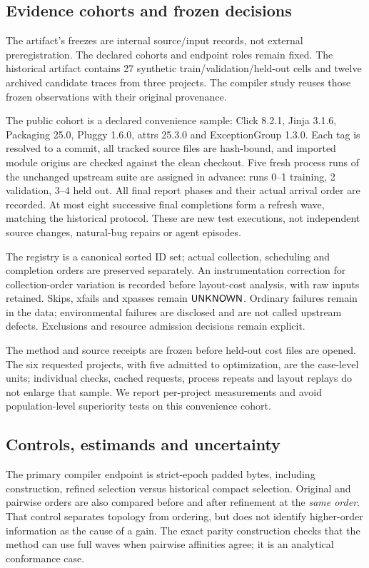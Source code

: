 \documentclass[10pt,journal,compsoc]{IEEEtran}
\theoremstyle{definition}\newtheorem{definition}[theorem]{Definition}
\begin{document}
\subsection{Evidence cohorts and frozen decisions}
The artifact's freezes are internal source/input records, not external
preregistration. The declared cohorts and endpoint roles remain fixed.
The historical artifact contains 27 synthetic train/validation/held-out
cells and twelve archived candidate traces from three projects.
The compiler study reuses those frozen observations with their original provenance.

The public cohort is a declared convenience sample: Click 8.2.1,
Jinja 3.1.6, Packaging 25.0, Pluggy 1.6.0, attrs 25.3.0 and
ExceptionGroup 1.3.0. Each tag is resolved to a commit, all tracked source
files are hash-bound, and imported module origins are checked against the
clean checkout. Five fresh process runs of the unchanged upstream suite
are assigned in advance: runs 0--1 training, 2 validation, 3--4 held out.
All final report phases and their actual arrival order are recorded.
At most eight successive final completions form a refresh wave, matching
the historical protocol. These are new test executions, not independent
source changes, natural-bug repairs or agent episodes.

The registry is a canonical sorted ID set; actual collection, scheduling and
completion orders are preserved separately. An instrumentation correction
for collection-order variation is recorded before layout-cost analysis,
with raw inputs retained. Skips, xfails and xpasses remain $\mathsf{UNKNOWN}$.
Ordinary failures remain in the data; environmental failures are disclosed
and are not called upstream defects. Exclusions and resource admission
decisions remain explicit.

The method and source receipts are frozen before held-out cost files are
opened. The six requested projects, with five admitted to optimization, are the case-level units; individual checks,
cached requests, process repeats and layout replays do not enlarge that
sample. We report per-project measurements and avoid population-level
superiority tests on this convenience cohort.

\subsection{Controls, estimands and uncertainty}
The primary compiler endpoint is strict-epoch padded bytes, including
construction, refined selection versus historical compact selection.
Original and pairwise orders are also compared before and after refinement
at the \emph{same order}. That control separates topology from ordering,
but does not identify higher-order information as the cause of a gain.
The exact parity construction checks that the method can use full waves
when pairwise affinities agree; it is an analytical conformance case.
\end{document}
